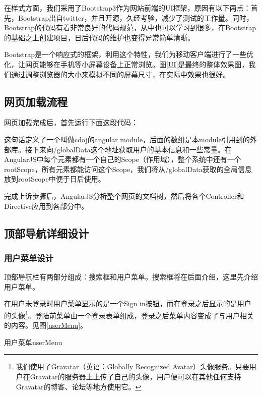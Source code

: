在样式方面，我们采用了Bootstrap3作为网站前端的UI框架，原因有以下两点：首先，Bootstrap出自twitter，并且开源，久经考验，减少了测试的工作量。同时，Bootstrap的代码有着非常良好的代码规范，从中也可以学习到很多，在Bootstrap的基础之上创建项目，日后代码的维护也变得异常简单清晰。

Bootstrap是一个响应式的框架，利用这个特性，我们为移动客户端进行了一些优化，让网页能够在手机等小屏幕设备上正常浏览。图\ref{UI}是最终的整体效果图，我们通过调整浏览器的大小来模拟不同的屏幕尺寸，在实际中效果也很好。

\subsection{网页加载流程}
网页加载完成后，首先运行下面这段代码：

这句话定义了一个叫做cdoj的angular module，后面的数组是本module引用到的外部库。接下来向/globalData这个地址获取用户的基本信息和一些常量。在AngularJS中每个元素都有一个自己的Scope（作用域），整个系统中还有一个rootScope，所有元素都能访问这个Scope，我们将从/globalData获取的全局信息放到rootScope中便于日后使用。





完成上诉步骤后，AngularJS分析整个网页的文档树，然后将各个Controller和Directive应用到各部分中。

\subsection{顶部导航详细设计}
\subsubsection{用户菜单设计}
顶部导航栏有两部分组成：搜索框和用户菜单。搜索框将在后面介绍，这里先介绍用户菜单。

在用户未登录时用户菜单显示的是一个Sign in按钮，而在登录之后显示的是用户的头像\footnote{我们使用了Gravatar（英语：Globally Recognized Avatar）头像服务。只要用户在Gravatar的服务器上上传了自己的头像，用户便可以在其他任何支持Gravatar的博客、论坛等地方使用它。}。登陆前菜单由一个登录表单组成，登录之后菜单内容变成了与用户相关的内容。见图\ref{userMenu}。

\begin{pics}[htbp]{用户菜单}{userMenu}
\end{pics}

